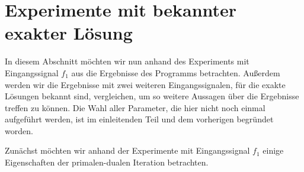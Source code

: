 \section{Experimente mit bekannter exakter Lösung}
\label{sec:experimentsWithExactSolution}

In diesem Abschnitt möchten wir nun anhand des Experiments mit Eingangssignal
$f_1$ aus  die Ergebnisse des Programms betrachten.
Außerdem werden wir die Ergebnisse mit zwei weiteren Eingangssignalen,
für die exakte Lösungen bekannt sind, vergleichen, um so weitere Aussagen
über die Ergebnisse treffen zu können.
Die Wahl aller Parameter, die hier nicht noch einmal aufgeführt werden, ist
im einleitenden Teil und dem vorherigen  
begründet worden.

Zunächst möchten wir anhand der Experimente mit Eingangssignal $f_1$ einige
Eigenschaften der primalen-dualen Iteration betrachten.
